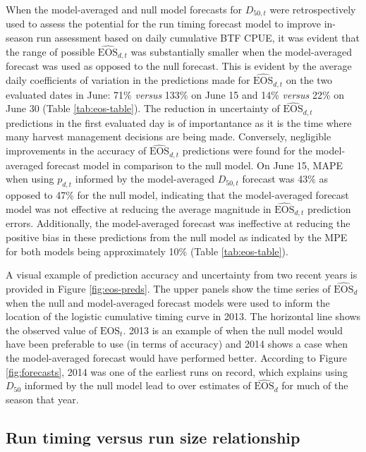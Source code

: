 \documentclass[12pt,]{book}
\theoremstyle{definition}
\theoremstyle{definition}
\theoremstyle{definition}
\theoremstyle{remark}
\begin{document}
\noindent
When the model-averaged and null model forecasts for \(D_{50,t}\) were
retrospectively used to assess the potential for the run timing forecast
model to improve in-season run assessment based on daily cumulative BTF
CPUE, it was evident that the range of possible
\(\widehat{\text{EOS}}_{d,t}\) was substantially smaller when the
model-averaged forecast was used as opposed to the null forecast. This
is evident by the average daily coefficients of variation in the
predictions made for \(\widehat{\text{EOS}}_{d,t}\) on the two evaluated
dates in June: 71\% \emph{versus} 133\% on June 15 and 14\%
\emph{versus} 22\% on June 30 (Table \ref{tab:eos-table}). The reduction
in uncertainty of \(\widehat{\text{EOS}}_{d,t}\) predictions in the
first evaluated day is of importantance as it is the time where many
harvest management decisions are being made. Conversely, negligible
improvements in the accuracy of \(\widehat{\text{EOS}}_{d,t}\)
predictions were found for the model-averaged forecast model in
comparison to the null model. On June 15, MAPE when using \(p_{d,t}\)
informed by the model-averaged \(D_{50,t}\) forecast was 43\% as opposed
to 47\% for the null model, indicating that the model-averaged forecast
model was not effective at reducing the average magnitude in
\(\widehat{\text{EOS}}_{d,t}\) prediction errors. Additionally, the
model-averaged forecast was ineffective at reducing the positive bias in
these predictions from the null model as indicated by the MPE for both
models being approximately 10\% (Table \ref{tab:eos-table}).

A visual example of prediction accuracy and uncertainty from two recent
years is provided in Figure \ref{fig:eos-preds}. The upper panels show
the time series of \(\widehat{\text{EOS}}_{d}\) when the null and
model-averaged forecast models were used to inform the location of the
logistic cumulative timing curve in 2013. The horizontal line shows the
observed value of \(\text{EOS}_t\). 2013 is an example of when the null
model would have been preferable to use (in terms of accuracy) and 2014
shows a case when the model-averaged forecast would have performed
better. According to Figure \ref{fig:forecasts}, 2014 was one of the
earliest runs on record, which explains using \(D_{50}\) informed by the
null model lead to over estimates of \(\widehat{\text{EOS}}_{d}\) for
much of the season that year.

\subsection{Run timing versus run size
relationship}\label{run-timing-versus-run-size-relationship}
\end{document}
